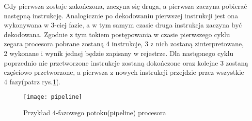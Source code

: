 \documentclass[document.tex]{subfiles}
\begin{document}
Gdy pierwsza zostaje zakończona, zaczyna się druga, a pierwsza
zaczyna pobierać następną instrukcję. Analogicznie po dekodowaniu pierwszej instrukcji jest ona wykonywana w 3-ciej fazie, a w tym samym czasie druga instrukcja zaczyna być dekodowana. Zgodnie z tym tokiem postępowania w czasie pierwszego cyklu zegara procesora pobrane zostaną 4 instrukcje, 3 z nich zostaną zinterpretowane, 2 wykonane i wynik jednej będzie zapisany w rejestrze. Dla następnego cyklu poprzednio 
nie przetworzone instrukcje zostaną dokończone oraz kolejne 3 zostaną częściowo przetworzone, a pierwsza z nowych instrukcji przejdzie przez wszystkie 4 fazy(patrz rys.\ref{fig:pipeline}).
\cite{Inside_Machine}\cite{Computer_Architecture_Patterson_Hennesy} 
\begin{figure}[h]
\texttt{[image: pipeline]}
\caption{Przykład 4-fazowego potoku(pipeline) procesora \protect\cite{Inside_Machine}}
\label{fig:pipeline}
\end{figure}
\end{document}
